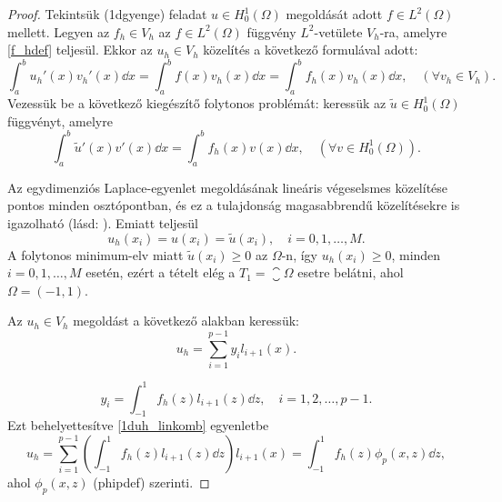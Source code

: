 \begin{proof}
	Tekintsük \aref({1dgyenge}) feladat $u \in H_0^1(\Omega)$ megoldását adott $f \in L^2(\Omega)$ mellett. Legyen az $f_h \in V_h$ az $f \in L^2(\Omega)$ függvény $L^2$-vetülete $V_h$-ra, amelyre \eqref{f_hdef} teljesül. Ekkor az $u_h \in V_h$ közelítés a következő formulával adott:
	\begin{equation*}
		\int_{a}^{b} u_h'(x)v_h'(x) \dd x =  \int_{a}^{b} f(x)v_h(x) \dd x = \int_a^b f_h(x) v_h(x) \dd x , \quad (\forall v_h \in V_h).
	\end{equation*}
	Vezessük be a következő kiegészítő folytonos problémát: keressük az $\tilde{u} \in H^1_0(\Omega)$ függvényt, amelyre
	\begin{equation*}
		\int_{a}^{b} \tilde{u}'(x)v'(x) \dd x =  \int_a^b f_h(x) v(x) \dd x , \quad (\forall v \in H^1_0(\Omega)).
	\end{equation*}
	
	Az egydimenziós Laplace-egyenlet megoldásának lineáris végeselsmes közelítése pontos minden osztópontban, és ez a tulajdonság magasabbrendű közelítésekre is igazolható (lásd: \cite{sol-seg}). Emiatt teljesül	
	\begin{equation*}
		u_h(x_i) = u(x_i) = \tilde{u}(x_i), \quad  i = 0, 1, \ldots, M.
	\end{equation*}
	A folytonos minimum-elv miatt $\tilde{u}(x_i) \geq 0$ az $\Omega$-n, így $u_h(x_i) \geq 0$, minden $i = 0, 1, \ldots, M$ esetén, ezért a tételt elég a $T_1 = \closure{\Omega}$ esetre belátni, ahol $\Omega = (-1,1)$.
	
	Az $u_h \in V_h$ megoldást a következő alakban keressük:
	\begin{equation}\label{1duh_linkomb}
		u_h = \sum_{i = 1}^{p-1} y_i l_{i+1}(x).
	\end{equation}
	
	\begin{equation*}
		y_i = \int_{-1}^1 f_h(z)l_{i+1}(z) \dd z, \quad  i = 1, 2, \ldots, p-1.
	\end{equation*}
	Ezt behelyettesítve \eqref{1duh_linkomb} egyenletbe
	\begin{equation}\label{uronda}
		u_h = \sum_{i = 1}^{p-1} \left( \int_{-1}^1 f_h(z)l_{i+1}(z) \dd z \right) l_{i+1}(x) = \int_{-1}^1 f_h(z) \phi_p(x,z) \dd z, 
	\end{equation}
	ahol $\phi_p(x,z)$ \aref({phipdef}) szerinti.
	

\end{proof}

